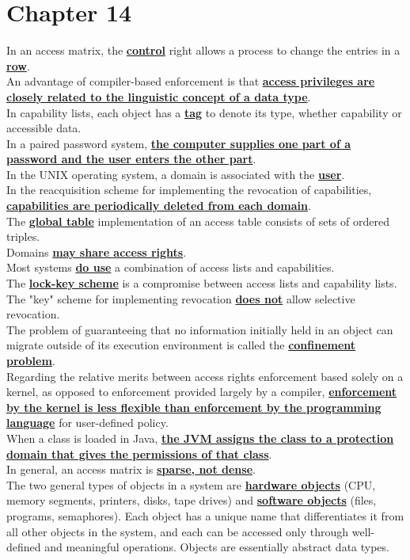 \documentclass[12pt]{article}
\newcommand{\qw}[1]{\textbf{\ul{#1}}}
\begin{document}
\section*{\centering Chapter 14}
In an access matrix, the \qw{control} right allows a process to change the entries in a \qw{row}.\\[2mm]
An advantage of compiler-based enforcement is that \qw{access privileges are closely related to the linguistic concept of a data type}.\\[2mm]
In capability lists, each object has a \qw{tag} to denote its type, whether capability or accessible data.\\[2mm]
In a paired password system, \qw{the computer supplies one part of a password and the user enters the other part}.\\[2mm]
In the UNIX operating system, a domain is associated with the \qw{user}.\\[2mm]
In the reacquisition scheme for implementing the revocation of capabilities, \qw{capabilities are periodically deleted from each domain}.\\[2mm]
The \qw{global table} implementation of an access table consists of sets of ordered triples.\\[2mm]
Domains \qw{may share access rights}.\\[2mm]
Most systems \qw{do use} a combination of access lists and capabilities.\\[2mm]
The \qw{lock-key scheme} is a compromise between access lists and capability lists.\\[2mm]
The "key" scheme for implementing revocation \qw{does not} allow selective revocation.\\[2mm]
The problem of guaranteeing that no information initially held in an object can migrate outside of its execution environment is called the \qw{confinement problem}.\\[2mm]
Regarding the relative merits between access rights enforcement based solely on a kernel, as opposed to enforcement provided largely by a compiler, \qw{enforcement by the kernel is less flexible than enforcement by the programming language} for user-defined policy.\\[2mm]
When a class is loaded in Java, \qw{the JVM assigns the class to a protection domain that gives the permissions of that class}.\\[2mm]
In general, an access matrix is \qw{sparse, not dense}.\\[2mm]
The two general types of objects in a system are \qw{hardware objects} (CPU, memory segments, printers, disks, tape drives) and \qw{software objects} (files, programs, semaphores). Each object has a unique name that differentiates it from all other objects in the system, and each can be accessed only through well-defined and meaningful operations. Objects are essentially abstract data types.\\[2mm]
\end{document}
